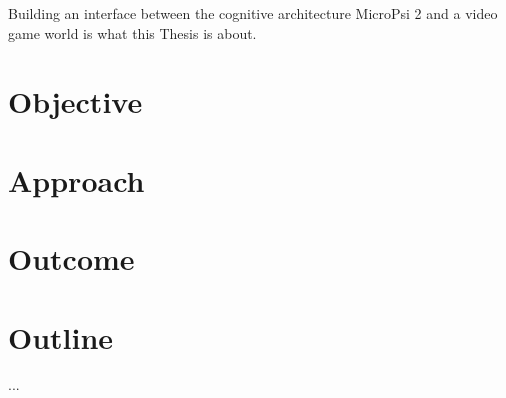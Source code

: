 Building an interface between the cognitive architecture MicroPsi 2 and a video game world is what this Thesis is about.

\section{Objective}

\section{Approach}

\section{Outcome}


\section{Outline}
...